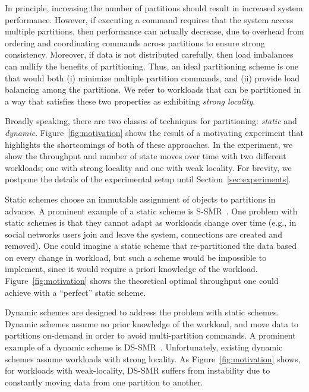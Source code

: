 In principle, increasing the number of partitions should result in
increased system performance. However, if executing a command
requires that the system access multiple partitions, then performance
can actually decrease, due to overhead from ordering and coordinating commands across partitions to
ensure strong consistency. Moreover, if data is not distributed
carefully, then load imbalances can nullify the benefits of
partitioning.  Thus, an ideal partitioning scheme is one that would
both (i) minimize multiple partition commands, and (ii) provide load
balancing among the partitions. We refer to workloads that can be
partitioned in a way that satisfies these two properties as exhibiting
\emph{strong locality}.

Broadly speaking, there are two classes of techniques for
partitioning: \emph{static} and \emph{dynamic}.
Figure~\ref{fig:motivation} shows the result of a motivating experiment
that highlights the shortcomings of both of these approaches. In
the experiment, we show the throughput and number of state moves
over time with two different workloads; one with strong locality
and one with weak locality. For brevity, we postpone the details
of the experimental setup until Section~\ref{sec:experiments}.

Static schemes choose an immutable assignment of objects to partitions in
advance.  A prominent example of a
static scheme is S-SMR~\cite{bezerra2014ssmr}. One problem with static schemes is
that they cannot adapt as workloads change over time (e.g., in social
networks users join and leave the system, connections are created and
removed). One could imagine a static scheme that re-partitioned the
data based on every change in workload, but such a scheme would be
impossible to implement, since it would require a priori knowledge of
the workload. Figure~\ref{fig:motivation} shows the theoretical
optimal throughput one could achieve with a ``perfect'' static scheme.


Dynamic schemes are designed to address the problem with static
schemes.  Dynamic schemes assume no prior knowledge of the workload,
and move data to partitions on-demand in order to avoid
multi-partition commands. A prominent example of a dynamic scheme is
DS-SMR~\cite{hoang2016}. Unfortunately, existing dynamic schemes assume
workloads with strong locality. As Figure~\ref{fig:motivation} shows,
for workloads with weak-locality, DS-SMR suffers from instability due
to constantly moving data from one partition to another.



